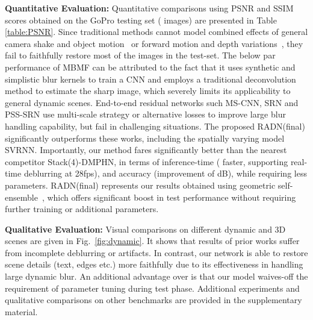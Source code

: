 \documentclass[letterpaper]{article} \usepackage{aaai20}  \usepackage{times}  \usepackage{helvet} \usepackage{courier}  \usepackage[hyphens]{url}  \usepackage{graphicx} \urlstyle{rm} \def\UrlFont{\rm}  \usepackage{graphicx}  \frenchspacing  \setlength{\pdfpagewidth}{8.5in}  \setlength{\pdfpageheight}{11in}
\begin{document}
\noindent \textbf{Quantitative Evaluation:}
Quantitative comparisons using PSNR and SSIM scores obtained on the GoPro testing set ( images) are presented in Table \ref{table:PSNR}. Since traditional methods cannot model combined effects of general camera shake and object motion~\cite{whyte2012non} or forward motion and depth variations~\cite{hyun2013dynamic}, they fail to faithfully restore most of the images in the test-set. The below par performance of MBMF can be attributed to the fact that it uses synthetic and simplistic blur kernels to train a CNN and employs a traditional deconvolution method to estimate the sharp image, which severely limits its applicability to general dynamic scenes. End-to-end residual networks such MS-CNN, SRN and PSS-SRN use multi-scale strategy or alternative losses to improve large blur handling capability, but fail in challenging situations. The proposed RADN(final) significantly outperforms these works, including the spatially varying model SVRNN. Importantly, our method fares significantly better than the nearest competitor Stack(4)-DMPHN, in terms of inference-time ( faster, supporting real-time deblurring at 28fps), and accuracy (improvement of  dB), while requiring  less parameters. RADN(final) represents our results obtained using geometric self-ensemble~\cite{lim2017enhanced}, which offers significant boost in test performance without requiring further training or additional parameters.


\noindent \textbf{Qualitative Evaluation:}
Visual comparisons on different dynamic and 3D scenes are given in Fig.~\ref{fig:dynamic}. It shows that results of prior works suffer from incomplete deblurring or artifacts. In contrast, our network is able to restore scene details (text, edges etc.) more faithfully due to its effectiveness in handling large dynamic blur. An additional advantage over \cite{hyun2013dynamic,whyte2012non} is that our model waives-off the requirement of parameter tuning during test phase. Additional experiments and qualitative comparisons on other benchmarks are provided in the supplementary material. 
\end{document}
